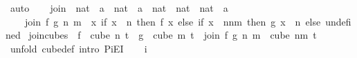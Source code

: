\begin{isabellebody}
\ auto%
\endisatagproof
{\isafoldproof}%
%
\isadelimproof
\ \ \isanewline
%
\endisadelimproof
\isanewline
{}\isamarkupfalse%
\ join\ {\isacharcolon}{\kern0pt}{\isacharcolon}{\kern0pt}\ {\isachardoublequoteopen}{\isacharparenleft}{\kern0pt}nat\ {\isasymRightarrow}\ {\isacharprime}{\kern0pt}a{\isacharparenright}{\kern0pt}\ {\isasymRightarrow}\ {\isacharparenleft}{\kern0pt}nat\ {\isasymRightarrow}\ {\isacharprime}{\kern0pt}a{\isacharparenright}{\kern0pt}\ {\isasymRightarrow}\ nat\ {\isasymRightarrow}\ nat\ {\isasymRightarrow}\ {\isacharparenleft}{\kern0pt}nat\ {\isasymRightarrow}\ {\isacharprime}{\kern0pt}a{\isacharparenright}{\kern0pt}{\isachardoublequoteclose}\isanewline
\ \ \isanewline
\ \ \ \ {\isachardoublequoteopen}join\ f\ g\ n\ m\ {\isasymequiv}\ {\isacharparenleft}{\kern0pt}{\isasymlambda}x{\isachardot}{\kern0pt}\ if\ x\ {\isasymin}\ {\isacharbraceleft}{\kern0pt}{\isachardot}{\kern0pt}{\isachardot}{\kern0pt}{\isacharless}{\kern0pt}n{\isacharbraceright}{\kern0pt}\ then\ f\ x\ else\ {\isacharparenleft}{\kern0pt}if\ x\ {\isasymin}\ {\isacharbraceleft}{\kern0pt}n{\isachardot}{\kern0pt}{\isachardot}{\kern0pt}{\isacharless}{\kern0pt}n{\isacharplus}{\kern0pt}m{\isacharbraceright}{\kern0pt}\ then\ g\ {\isacharparenleft}{\kern0pt}x\ {\isacharminus}{\kern0pt}\ n{\isacharparenright}{\kern0pt}\ else\ undefined{\isacharparenright}{\kern0pt}{\isacharparenright}{\kern0pt}{\isachardoublequoteclose}\isanewline
\isanewline
{}\isamarkupfalse%
\ join{\isacharunderscore}{\kern0pt}cubes{\isacharcolon}{\kern0pt}\ \ {\isachardoublequoteopen}f\ {\isasymin}\ cube\ n\ {\isacharparenleft}{\kern0pt}t{\isacharplus}{\kern0pt}{}{\isacharparenright}{\kern0pt}{\isachardoublequoteclose}\ \ {\isachardoublequoteopen}g\ {\isasymin}\ cube\ m\ {\isacharparenleft}{\kern0pt}t{\isacharplus}{\kern0pt}{}{\isacharparenright}{\kern0pt}{\isachardoublequoteclose}\ \ {\isachardoublequoteopen}join\ f\ g\ n\ m\ {\isasymin}\ cube\ {\isacharparenleft}{\kern0pt}n{\isacharplus}{\kern0pt}m{\isacharparenright}{\kern0pt}\ {\isacharparenleft}{\kern0pt}t{\isacharplus}{\kern0pt}{}{\isacharparenright}{\kern0pt}{\isachardoublequoteclose}\isanewline
%
\isadelimproof
%
\endisadelimproof
%
\isatagproof
{}\isamarkupfalse%
\ {\isacharparenleft}{\kern0pt}unfold\ cube{\isacharunderscore}{\kern0pt}def{\isacharsemicolon}{\kern0pt}\ intro\ PiE{\isacharunderscore}{\kern0pt}I{\isacharparenright}{\kern0pt}\isanewline
\ \ \isamarkupfalse%
\ i\isanewline

\end{isabellebody}
